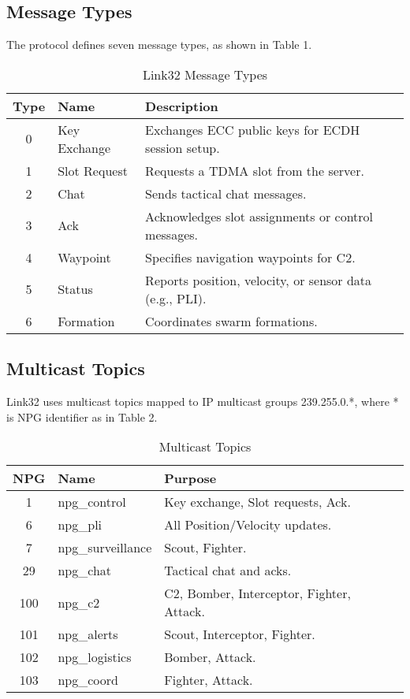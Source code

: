 \documentclass{article}
\begin{document}
\newpage
\subsection{Message Types}
The protocol defines seven message types, as shown in Table 1.

\begin{table}[h]
\centering
\caption{Link32 Message Types}
\begin{tabular}{clp{6cm}}
\hline
\textbf{Type} & \textbf{Name} & \textbf{Description} \\
\hline
0 & Key Exchange & Exchanges ECC public keys for ECDH session setup. \\
1 & Slot Request & Requests a TDMA slot from the server. \\
2 & Chat         & Sends tactical chat messages. \\
3 & Ack          & Acknowledges slot assignments or control messages. \\
4 & Waypoint     & Specifies navigation waypoints for C2. \\
5 & Status       & Reports position, velocity, or sensor data (e.g., PLI). \\
6 & Formation    & Coordinates swarm formations. \\
\hline
\end{tabular}
\end{table}

\subsection{Multicast Topics}
Link32 uses multicast topics mapped to IP multicast groups 239.255.0.*, where * is NPG identifier as in Table 2.

\begin{table}[h]
\centering
\caption{Multicast Topics}
\begin{tabular}{cllp{5cm}}
\hline
\textbf{NPG} & \textbf{Name} & \textbf{Purpose} \\
\hline
1   & npg\_control      & Key exchange, Slot requests, Ack. \\
6   & npg\_pli          & All Position/Velocity updates. \\
7   & npg\_surveillance & Scout, Fighter. \\
29  & npg\_chat         & Tactical chat and acks. \\
100 & npg\_c2           & C2, Bomber, Interceptor, Fighter, Attack. \\
101 & npg\_alerts       & Scout, Interceptor, Fighter. \\
102 & npg\_logistics    & Bomber, Attack. \\
103 & npg\_coord        & Fighter, Attack. \\
\hline
\end{tabular}
\end{table}
\end{document}

